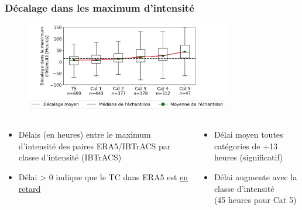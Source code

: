 \documentclass[aspectratio=169, usepdftitle=false, xcolor={dvipsnames}, 9pt,table]{beamer}
\begin{document}
 \begin{frame}[t]
     \frametitle{Décalage dans les maximum d'intensité}
     \begin{figure}
         \centering
         \includegraphics[width=0.8\textwidth]{Figures/lag_max_intensity_myVTU.png}
     \end{figure}
     \begin{columns}
         \footnotesize
         \setlength{\leftmargini}{3ex}
         \begin{column}{0.5\textwidth}
             \begin{examples}
                 \begin{itemize}
                     \item Délais (en heures) entre le maximum d'intensité des paires ERA5/IBTrACS par classe d'intensité (IBTrACS)
                     \item Délai > 0 indique que le TC dans ERA5 est \underline{en retard}
                 \end{itemize}
             \end{examples}
         \end{column}
         \begin{column}{0.5\textwidth}
             \begin{block} 
                 \begin{itemize}
                     \item Délai moyen toutes catégories de \alert{+13 heures} (significatif)
                     \item Délai \alert{augmente} avec la classe d'intensité\\(45 heures pour Cat 5)
                 \end{itemize}
             \end{block}
         \end{column}
     \end{columns}
 \end{frame}
 
\end{document}
